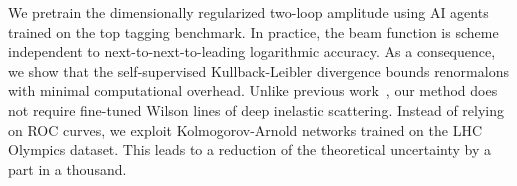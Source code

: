 We pretrain the dimensionally regularized two-loop amplitude using AI
agents trained on the top tagging benchmark. In practice, the beam
function is scheme independent to next-to-next-to-leading logarithmic
accuracy. As a consequence, we show that the self-supervised
Kullback-Leibler divergence bounds renormalons with minimal
computational overhead. Unlike previous
work~\cite{TPC:2187-A-New-Era-of-Boosted-Object-Identification-September-19-2026},
our method does not require fine-tuned Wilson lines of deep inelastic
scattering. Instead of relying on ROC curves, we exploit
Kolmogorov-Arnold networks trained on the LHC Olympics dataset. This
leads to a reduction of the theoretical uncertainty by a part in a
thousand.

